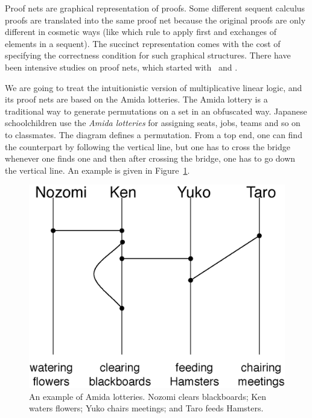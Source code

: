 Proof nets are graphical representation of proofs.
Some different sequent calculus proofs are translated into the same
proof net because the original proofs are only different in cosmetic
ways (like which rule to apply first and exchanges of elements in a
sequent).
The succinct representation comes with the cost of specifying
the correctness condition for such graphical structures.
There have been intensive studies on proof nets,
which started with~\citet{girard1987} and \citet{danos-regnier}.

 We are going to treat the intuitionistic version of
 multiplicative linear logic, and its proof nets are based on the Amida
 lotteries.
 The Amida lottery is a traditional way to generate permutations on a set
 in an obfuscated way.
 Japanese schoolchildren use the \textit{Amida lotteries}
 for assigning seats, jobs, teams and so on to classmates.
 The diagram defines a permutation.
 From a top end, one can find the counterpart by following the vertical
 line, but one has to cross the bridge whenever one finds one and then
 after crossing the bridge, one has to go down the vertical line.
 An example is given in Figure~\ref{amida-lottery}.

 \begin{figure}[h]
  \centering
  \includegraphics[scale=0.6]{amida.eps}
  \caption[An example of the Amida lotteries.]{An example of Amida
  lotteries.  Nozomi clears blackboards; Ken waters flowers; Yuko chairs
  meetings; and Taro feeds Hamsters.}
  \label{amida-lottery}
 \end{figure}


